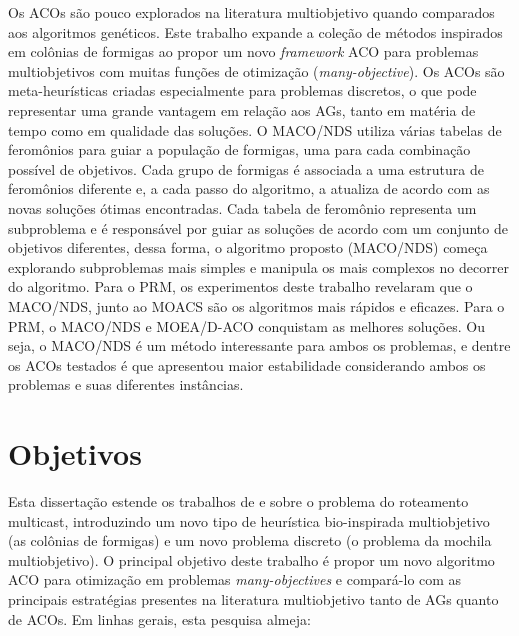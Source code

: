 Os \acp{ACO} são pouco explorados na literatura multiobjetivo quando comparados aos algoritmos genéticos. Este trabalho expande a coleção de métodos inspirados em colônias de formigas ao propor um novo \textit{framework} ACO para problemas multiobjetivos com muitas funções de otimização (\textit{many-objective}). Os ACOs são meta-heurísticas criadas especialmente para problemas discretos, o que pode representar uma grande vantagem em relação aos AGs, tanto em matéria de tempo como em qualidade das soluções. O MACO/NDS utiliza várias tabelas de feromônios para guiar a população de formigas, uma para cada combinação possível de objetivos. Cada grupo de formigas é associada a uma estrutura de feromônios diferente e, a cada passo do algoritmo, a atualiza de acordo com as novas soluções ótimas encontradas. Cada tabela de feromônio representa um subproblema e é responsável por guiar as soluções de acordo com um conjunto de objetivos diferentes, dessa forma, o algoritmo proposto (MACO/NDS) começa explorando subproblemas mais simples e manipula os mais complexos no decorrer do algoritmo. Para o PRM, os experimentos deste trabalho revelaram que o MACO/NDS, junto ao MOACS são os algoritmos mais rápidos e eficazes. Para o PRM, o MACO/NDS e MOEA/D-ACO conquistam as melhores soluções. Ou seja, o MACO/NDS é um método interessante para ambos os problemas, e dentre os ACOs testados é que apresentou maior estabilidade considerando ambos os problemas e suas diferentes instâncias.

\section{Objetivos}
Esta dissertação estende os trabalhos de  e  sobre o problema do roteamento multicast, introduzindo um novo tipo de heurística bio-inspirada multiobjetivo (as colônias de formigas) e um novo problema discreto (o problema da mochila multiobjetivo). O principal objetivo deste trabalho é propor um novo algoritmo ACO para otimização em problemas \textit{many-objectives} e compará-lo com as principais estratégias presentes na literatura multiobjetivo tanto de AGs quanto de ACOs. Em linhas gerais, esta pesquisa almeja:
 
